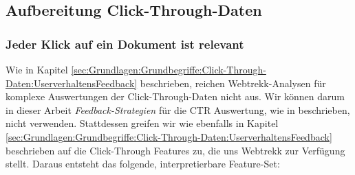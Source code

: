 \subsection{Aufbereitung Click-Through-Daten}
\label{sec:Reranking:Methodik:Click-Through-Daten}

\subsubsection{Jeder Klick auf ein Dokument ist relevant}
\label{sec:Reranking:Methodik:Click-Through-Daten:Click-Through-DatenAuswertungen}

Wie in Kapitel \ref{sec:Grundlagen:Grundbegriffe:Click-Through-Daten:UserverhaltensFeedback} beschrieben, reichen Webtrekk-Analysen für komplexe Auswertungen der Click-Through-Daten nicht aus. Wir können darum in dieser Arbeit \textit{Feedback-Strategien} für die CTR Auswertung, wie in \cite{Joachims} beschrieben, nicht verwenden. Stattdessen greifen wir wie ebenfalls in Kapitel \ref{sec:Grundlagen:Grundbegriffe:Click-Through-Daten:UserverhaltensFeedback} beschrieben auf die Click-Through Features zu, die uns Webtrekk zur Verfügung stellt. Daraus entsteht das folgende, interpretierbare Feature-Set:

\begin{table}[H]
\vspace{-.75em}
 \caption[Interpretierbares Feature-Set aus den Webtrekk Click-Through-Daten]{Interpretierbares Feature-Set aus den Webtrekk Click-Through-Daten}
\label{tab:Feature-Set}
\vspace{-.5em}
\footnotesize
\renewcommand*{\arraystretch}{1.2}
\vspace{-2em}
\end{table}

